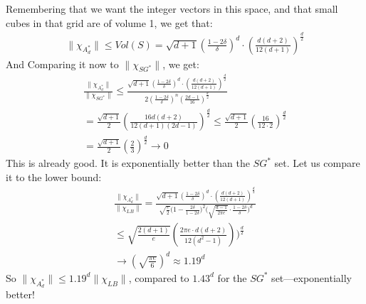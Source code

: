 Remembering that we want the integer vectors in this space, and that small cubes in that grid are of volume 1, we get that:
\begin{align}
    \|\chi_{A_d^*}\|\leq Vol(S)=\sqrt{d+1}(\frac{1-2\delta}{\delta})^d\cdot(\frac{d(d+2)}{12(d+1)})^{\frac{d}{2}}
\end{align}
And Comparing it now to $\|\chi_{SG^*}\|$, we get:
\begin{align*}
    \frac{\|\chi_{A_d^*}\|}{\|\chi_{SG^*}\|}\leq\frac{\sqrt{d+1}(\frac{1-2\delta}{\delta})^d\cdot(\frac{d(d+2)}{12(d+1)})^{\frac{d}{2}}}{2(\frac{1-2\delta}{\delta})^n(\frac{2d-1}{16})^{\frac{d}{2}}} \\
    =\frac{\sqrt{d+1}}{2}(\frac{16d(d+2)}{12(d+1)(2d-1)})^{\frac{d}{2}}\leq\frac{\sqrt{d+1}}{2}(\frac{16}{12\cdot2})^{\frac{d}{2}} \\
    = \frac{\sqrt{d+1}}{2}(\frac{2}{3})^{\frac{d}{2}}\rightarrow 0
\end{align*}
This is already good. It is exponentially better than the $SG^*$ set. Let us compare it to the lower bound:
\begin{align*}
    \frac{\|\chi_{A_d^*}\|}{\|\chi_{LB}\|}=\frac{\sqrt{d+1}(\frac{1-2\delta}{\delta})^d\cdot(\frac{d(d+2)}{12(d+1)})^{\frac{d}{2}}}{\sqrt{\frac{e}{2}}\Big(1-\frac{2\delta}{1-2\delta}\Big)^2\Big(\sqrt{\frac{d-1}{2\pi e}}\cdot \frac{1-2\delta}{\delta}\Big)^d} \\
    \leq \sqrt{\frac{2(d+1)}{e}}(\frac{2\pi e\cdot d(d+2)}{12(d^2-1)}))^{\frac{d}{2}} \\
    \rightarrow (\sqrt{\frac{\pi e}{6}})^d\approx1.19^d
\end{align*}
So $\|\chi_{A_d^*}\|\leq1.19^d\|\chi_{LB}\|$, compared to $1.43^d$ for the $SG^*$ set---exponentially better!
